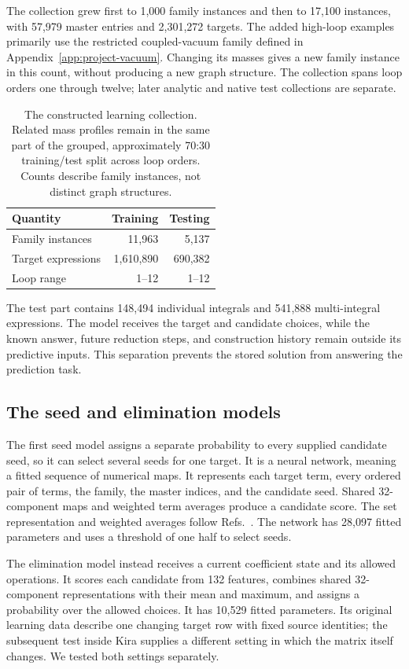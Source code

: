 The collection grew first to 1,000 family instances and then to 17,100 instances, with 57,979 master entries and 2,301,272 targets. The added high-loop examples primarily use the restricted coupled-vacuum family defined in Appendix~\ref{app:project-vacuum}. Changing its masses gives a new family instance in this count, without producing a new graph structure. The collection spans loop orders one through twelve; later analytic and native test collections are separate.

\begin{table}[!htbp]\centering\small
\caption{The constructed learning collection. Related mass profiles remain in the same part of the grouped, approximately 70:30 training/test split across loop orders. Counts describe family instances, not distinct graph structures.}
\label{tab:project-data}
\begin{tabular}{@{}lrr@{}}\toprule
Quantity & Training & Testing\\\midrule
Family instances & 11,963 & 5,137\\
Target expressions & 1,610,890 & 690,382\\
Loop range & 1--12 & 1--12\\\bottomrule
\end{tabular}
\end{table}
The test part contains 148,494 individual integrals and 541,888 multi-integral expressions. The model receives the target and candidate choices, while the known answer, future reduction steps, and construction history remain outside its predictive inputs. This separation prevents the stored solution from answering the prediction task.

\subsection{The seed and elimination models}
The first seed model assigns a separate probability to every supplied candidate seed, so it can select several seeds for one target. It is a neural network, meaning a fitted sequence of numerical maps. It represents each target term, every ordered pair of terms, the family, the master indices, and the candidate seed. Shared 32-component maps and weighted term averages produce a candidate score. The set representation and weighted averages follow Refs.~\cite{DeepSets,AttentionIsAllYouNeed}. The network has 28,097 fitted parameters and uses a threshold of one half to select seeds.

The elimination model instead receives a current coefficient state and its allowed operations. It scores each candidate from 132 features, combines shared 32-component representations with their mean and maximum, and assigns a probability over the allowed choices. It has 10,529 fitted parameters. Its original learning data describe one changing target row with fixed source identities; the subsequent test inside Kira supplies a different setting in which the matrix itself changes. We tested both settings separately.

